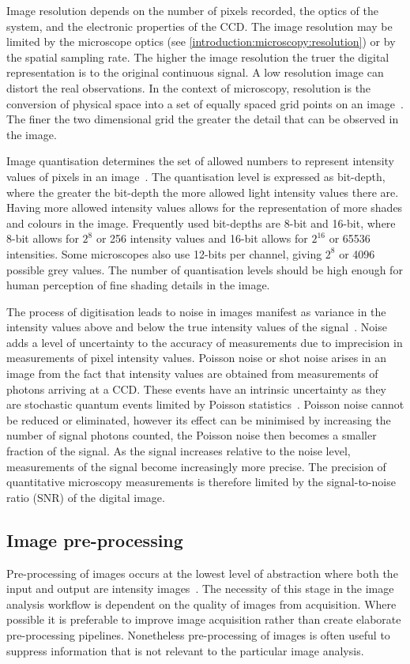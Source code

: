 Image resolution depends on the number of pixels recorded, the optics of the system, and the electronic properties of the CCD. The image resolution may be limited by the microscope optics (see \autoref{introduction:microscopy:resolution}) or by the spatial sampling rate. The higher the image resolution the truer the digital representation is to the original continuous signal. A low resolution image can distort the real observations. In the context of microscopy, resolution is the conversion of physical space into a set of equally spaced grid points on an image~\cite{Russ2006}. The finer the two dimensional grid the greater the detail that can be observed in the image.

Image quantisation determines the set of allowed numbers to represent intensity values of pixels in an image~\cite{Pawley2006}. The quantisation level is expressed as bit-depth, where the greater the bit-depth the more allowed light intensity values there are. Having more allowed intensity values allows for the representation of more shades and colours in the image. Frequently used bit-depths are 8-bit and 16-bit, where 8-bit allows for $2^{8}$ or 256 intensity values and 16-bit allows for $2^{16}$ or 65536 intensities. Some microscopes also use 12-bits per channel, giving $2^{8}$ or 4096 possible grey values. The number of quantisation levels should be high enough for human perception of fine shading details in the image.

The process of digitisation leads to noise in images manifest as variance in the intensity values above and below the true intensity values of the signal~\cite{Waters2009}. Noise adds a level of uncertainty to the accuracy of measurements due to imprecision in measurements of pixel intensity values. Poisson noise or shot noise arises in an image from the fact that intensity values are obtained from measurements of photons arriving at a CCD. These events have an intrinsic uncertainty as they are stochastic quantum events limited by Poisson statistics~\cite{Pawley2000}. Poisson noise cannot be reduced or eliminated, however its effect can be minimised by increasing the number of signal photons counted, the Poisson noise then becomes a smaller fraction of the signal. As the signal increases relative to the noise level, measurements of the signal become increasingly more precise. The precision of quantitative microscopy measurements is therefore limited by the signal-to-noise ratio (SNR) of the digital image.

\subsection{Image pre-processing}
\label{introduction:image_processing:image_preprocessing}
Pre-processing of images occurs at the lowest level of abstraction where both the input and output are intensity images~\cite{Sonka2007}. The necessity of this stage in the image analysis workflow is dependent on the quality of images from acquisition. Where possible it is preferable to improve image acquisition rather than create elaborate pre-processing pipelines. Nonetheless pre-processing of images is often useful to suppress information that is not relevant to the particular image analysis.

